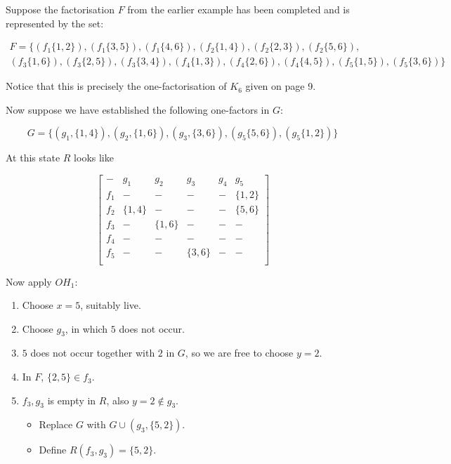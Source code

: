 \documentclass[
  11pt,
  a4paper]{book}\usepackage[]{graphicx}\usepackage[]{xcolor}
\newcounter{example}
\begin{document}
\begin{example}
Suppose the factorisation $F$ from the earlier example has
been completed and is represented by the set:

\begin{equation}
  \begin{split}
    F = \{(f_1\{1,2\}),(f_1\{3,5\}),(f_1\{4,6\}),(f_2\{1,4\}),(f_2\{2,3\}),(f_2\{5,6\}), \\
    (f_3\{1,6\}),(f_3\{2,5\}),(f_3\{3,4\}),(f_4\{1,3\}),(f_4\{2,6\}),(f_4\{4,5\}),(f_5\{1,5\}),(f_5\{3,6\})\}
  \end{split}
\end{equation}

Notice that this is precisely the one-factorisation of $K_6$
given on page 9.

Now suppose we have established the following one-factors in
$G$:

\begin{equation}
  G = \{(g_1, \{1, 4\}), (g_2, \{1, 6\}), (g_3, \{3, 6\}), (g_5\{5, 6\}), (g_5\{1, 2\})\}
\end{equation}

At this state $R$ looks like 

\begin{equation}
  \begin{bmatrix}
     -  &   g_1    &    g_2    &    g_3   & g_4 &    g_5    \\
    f_1 &     -    &     -     &    -     &  -  & \{1, 2\}  \\
    f_2 & \{1, 4\} &     -     &    -     &  -  & \{5, 6\}  \\
    f_3 &     -    &  \{1, 6\} &    -     &  -  &     -     \\
    f_4 &     -    &     -     &    -     &  -  &     -     \\
    f_5 &     -    &     -     & \{3, 6\} &  -  &     -     \\
  \end{bmatrix}
\end{equation}

Now apply $OH_1$:

\begin{enumerate}
  \item{Choose $x = 5$, suitably live.}
  \item{Choose $g_3$, in which $5$ does not occur.}
  \item{$5$ does not occur together with $2$ in $G$, so we are
     free to choose $y = 2$.}
  \item{In $F$, $\{2, 5\} \in f_3$.}
  \item{
    $f_3, g_3$ is empty in $R$, also $y = 2 \notin g_3$.
    \begin{itemize}
       \item{Replace $G$ with $G \cup (g_3, \{5, 2\})$.}
       \item{Define $R(f_3, g_3) = \{5, 2\}$.}
    \end{itemize}
  }
\end{enumerate}


\end{example}
\end{document}
